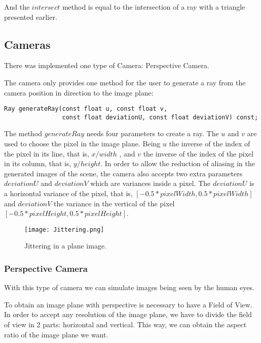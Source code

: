 \par
And the
$intersect$
method is equal to the intersection of a ray with a triangle presented earlier.

\subsection{Cameras}

\par
There was implemented one type of Camera: Perspective Camera.

\par
The camera only provides one method for the user to generate a ray from the camera position in direction to the image plane:

\begin{lstlisting}
Ray generateRay(const float u, const float v,
                const float deviationU, const float deviationV) const;
\end{lstlisting}

\par
The method
$generateRay$
needs four parameters to create a ray.
The $u$ and $v$
are used to choose the pixel in the image plane.
Being
$u$
the inverse of the index of the pixel in its line, that is,
$x / width$
, and
$v$
the inverse of the index of the pixel in its column, that is,
$y / height$.
In order to allow the reduction of aliasing in the generated images of the scene, the camera also accepts two extra parameters
$deviationU$ and $deviationV$
which are variances inside a pixel.
The
$deviationU$
is a horizontal variance of the pixel, that is,
$[-0.5*pixelWidth, 0.5*pixelWidth]$
and
$deviationV$ the variance in the vertical of the pixel
$[-0.5*pixelHeight, 0.5*pixelHeight]$.

\begin{figure}[H]
	\centering
	\caption{Jittering in a plane image.}
	\label{Jittering.}
	\texttt{[image: Jittering.png]}
\end{figure}

\subsubsection{Perspective Camera}

\par
With this type of camera we can simulate images being seen by the human eyes.

\par
To obtain an image plane with perspective is necessary to have a Field of View.
In order to accept any resolution of the image plane, we have to divide the field of view in 2 parts: horizontal and vertical.
This way, we can obtain the aspect ratio of the image plane we want.

